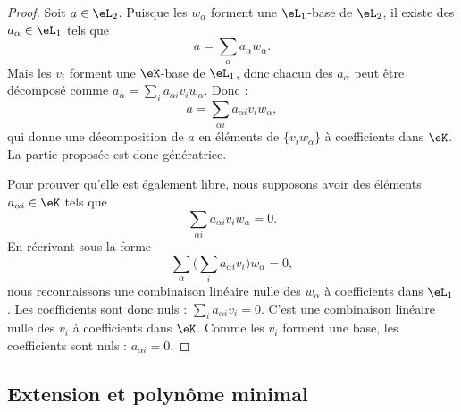 \begin{proof}
	Soit \( a\in \eL_2\). Puisque les \( w_{\alpha}\) forment une \( \eL_1\)-base de \( \eL_2\), il existe des \( a_{\alpha}\in \eL_1\) tels que
	\begin{equation}
		a=\sum_{\alpha}a_{\alpha}w_{\alpha}.
	\end{equation}
	Mais les \( v_i\) forment une \( \eK\)-base de \( \eL_1\), donc chacun des \( a_{\alpha}\) peut être décomposé comme \( a_{\alpha}=\sum_ia_{\alpha i}v_iw_{\alpha}\). Donc :
	\begin{equation}
		a=\sum_{\alpha i}a_{\alpha i}v_iw_{\alpha},
	\end{equation}
	qui donne une décomposition de \( a\) en éléments de \( \{ v_iw_{\alpha} \}\) à coefficients dans \( \eK\). La partie proposée est donc génératrice.

	Pour prouver qu'elle est également libre, nous supposons avoir des éléments \( a_{\alpha i}\in \eK\) tels que
	\begin{equation}
		\sum_{\alpha i}a_{\alpha i}v_iw_{\alpha}=0.
	\end{equation}
	En récrivant sous la forme
	\begin{equation}
		\sum_{\alpha}\Big( \sum_ia_{\alpha i}v_i \Big)w_{\alpha}=0,
	\end{equation}
	nous reconnaissons une combinaison linéaire nulle des \( w_{\alpha}\) à coefficients dans \( \eL_1\). Les coefficients sont donc nuls : \( \sum_i a_{\alpha i}v_i=0\). C'est une combinaison linéaire nulle des \( v_i\) à coefficients dans \( \eK\). Comme les \( v_i\) forment une base, les coefficients sont nuls : \( a_{\alpha i}=0\).
\end{proof}

\subsection{Extension et polynôme minimal}

